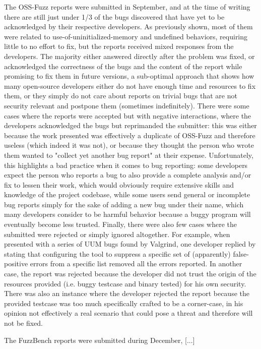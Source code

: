 The OSS-Fuzz reports were submitted in September, and at the time of writing there are still just under 1/3 of the bugs discovered that have yet to be acknowledged by their respective developers. 
As previously shown, most of them were related to use-of-uninitialized-memory and undefined behaviors, requiring little to no effort to fix, but the reports received mixed responses from the developers. The majority either answered directly after the problem was fixed, or acknowledged the correctness of the bugs and the content of the report while promising to fix them in future versions, a sub-optimal approach that shows how many open-source developers either do not have enough time and resources to fix them, or they simply do not care about reports on trivial bugs that are not security relevant and postpone them (sometimes indefinitely). 
There were some cases where the reports were accepted but with negative interactions, where the developers acknowledged the bugs but reprimanded the submitter: this was either because the work presented was effectively a duplicate of OSS-Fuzz and therefore useless (which indeed it was not), or because they thought the person who wrote them wanted to "collect yet another bug report" at their expense. Unfortunately, this highlights a bad practice when it comes to bug reporting: some developers expect the person who reports a bug to also provide a complete analysis and/or fix to lessen their work, which would obviously require extensive skills and knowledge of the project codebase, while some users send general or incomplete bug reports simply for the sake of adding a new bug under their name, which many developers consider to be harmful behavior because a buggy program will eventually become less trusted.
Finally, there were also few cases where the submitted were rejected or simply ignored altogether. For example, when presented with a series of UUM bugs found by Valgrind, one developer replied by stating that configuring the tool to suppress a specific set of (apparently) false-positive errors from a specific list removed all the errors reported. In another case, the report was rejected because the developer did not trust the origin of the resources provided (i.e. buggy testcase and binary tested) for his own security. There was also an instance where the developer rejected the report because the provided testcase was too much specifically crafted to be a corner-case, in his opinion not effectively a real scenario that could pose a threat and therefore will not be fixed.  

The FuzzBench reports were submitted during December, [...] 

